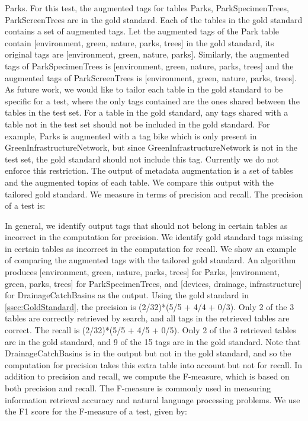 Parks. For this test, the augmented tags for tables {Parks, ParkSpecimenTrees, ParkScreenTrees} are in the gold standard.
Each of the tables in the gold standard contains a set of augmented tags. Let the augmented tags of the Park table contain [environment, green, nature, parks, trees] in the gold standard, its original tags are [environment, green, nature, parks]. Similarly, the augmented tags of ParkSpecimenTrees is [environment, green, nature, parks, trees] and the augmented tags of ParkScreenTrees is [environment, green, nature, parks, trees]. As future work, we would like to tailor each table in the gold standard to be specific for a test, where the only tags contained are the ones shared between the tables in the test set. For a table in the gold standard, any tags shared with a table not in the test set should not be included in the gold standard. For example, Parks is augmented with a tag bike which is only present in GreenInfrastructureNetwork, but since GreenInfrastructureNetwork is not in the test set, the gold standard should not include this tag. Currently we do not enforce this restriction.
The output of metadata augmentation is a set of tables and the augmented topics of each table. We compare this output with the tailored gold standard. We measure in terms of precision and recall. The precision of a test is:

In general, we identify output tags that should not belong in certain tables as incorrect in the computation for precision. We identify gold standard tags missing in certain tables as incorrect in the computation for recall.
We show an example of comparing the augmented tags with the tailored gold standard. An algorithm produces [environment, green, nature, parks, trees] for Parks, [environment, green, parks, trees] for ParkSpecimenTrees, and [devices, drainage, infrastructure] for DrainageCatchBasins as the output. Using the gold standard in \autoref{ssec:GoldStandard}, the precision is (2/32)*(5/5 + 4/4 + 0/3). Only 2 of the 3 tables are correctly retrieved by search, and all tags in the retrieved tables are correct. The recall is (2/32)*(5/5 + 4/5 + 0/5). Only 2 of the 3 retrieved tables are in the gold standard, and 9 of the 15 tags are in the gold standard. Note that DrainageCatchBasins is in the output but not in the gold standard, and so the computation for precision takes this extra table into account but not for recall.
In addition to precision and recall, we compute the F-measure, which is based on both precision and recall. The F-measure is commonly used in measuring information retrieval accuracy and natural language processing problems. We use the F1 score for the F-measure of a test, given by:


